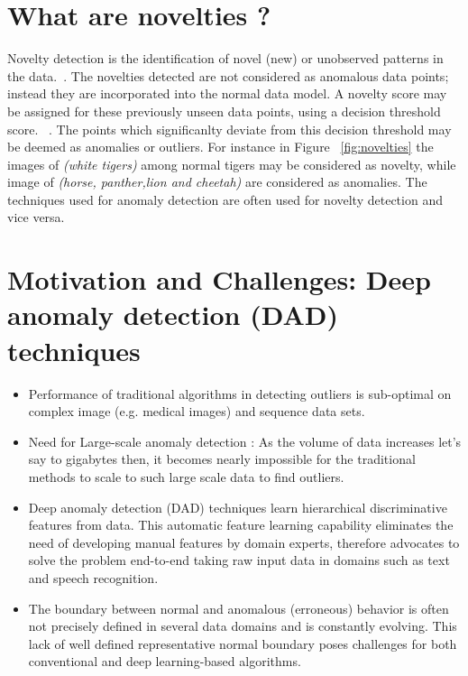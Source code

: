 \section{What are novelties ?}
Novelty detection is the identification of novel (new) or unobserved patterns in the data.~\cite{miljkovic2010review}. The novelties detected are not considered as anomalous data points; instead they are incorporated into the normal data model. A novelty score may be assigned for these previously unseen data points, using a decision threshold score. ~\cite{pimentel2014review}.  The points which significanlty deviate from this decision threshold may be deemed as anomalies or outliers. For instance in Figure ~\ref{fig:novelties}  the images of \textit{(white tigers)} among normal tigers may be considered as novelty, while image of \textit{(horse, panther,lion and cheetah)} are considered as anomalies.
The techniques used for anomaly detection are often used for novelty detection and vice versa.



\section{Motivation and Challenges: Deep anomaly detection (DAD) techniques}
\begin{itemize}
\item Performance of traditional algorithms in detecting outliers is sub-optimal on complex image (e.g. medical images) and sequence data sets.
\item  Need for Large-scale anomaly detection : As the volume of data increases let's say to gigabytes then, it becomes nearly impossible for the traditional methods to scale to such large scale data to find outliers.
\item  Deep anomaly detection (DAD) techniques learn hierarchical discriminative features from data. This automatic feature learning capability eliminates the need of developing manual features by domain experts, therefore advocates to solve the problem end-to-end taking raw input data in domains such as text and speech recognition.
\item The boundary between normal and anomalous (erroneous) behavior is often not precisely defined  in several data domains and is constantly evolving. This lack of well defined representative normal boundary poses challenges for both conventional and deep learning-based algorithms.
\end{itemize}

